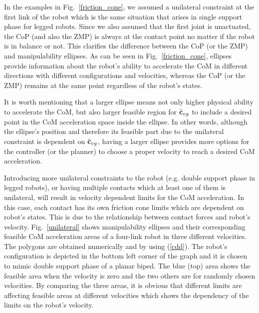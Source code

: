 In the examples in Fig.~\ref{friction_cone}, we assumed a unilateral
constraint at the first link of the robot which is the same situation that
arises in single support phase for legged robots.  Since we also assumed that
the first joint is unactuated, the CoP (and also the ZMP) is always at the
contact point no matter if the robot is in balance or not.  This clarifies the
difference between the CoP (or the ZMP) and manipulability ellipses.  As can
be seen in Fig.~\ref{friction_cone}, ellipses provide information about the
robot's ability to accelerate the CoM in different directions with different
configurations and velocities, whereas the CoP (or the ZMP) remains at the
same point regardless of the robot's states.

It is worth mentioning that a larger ellipse means not only higher physical
ability to accelerate the CoM, but also larger feasible region for
$\ddot{\mathbf{c}}_{vg}$ to include a desired point in the CoM acceleration space
inside the ellipse.  In other words, although the ellipse's position and
therefore its feasible part due to the unilateral constraint is dependent on
$\ddot{\mathbf{c}}_{vg}$, having a larger ellipse provides more options for the
controller (or the planner) to choose a proper velocity to reach a desired CoM
acceleration.

Introducing more unilateral constraints to the robot (e.g. double support
phase in legged robots), or having multiple contacts which at least one of
them is unilateral, will result in velocity dependent limits for the CoM
acceleration.  In this case, each contact has its own friction cone limits
which are dependent on robot's states.  This is due to the relationship
between contact forces and robot's velocity.  Fig.~\ref{unilateral} shows
manipulability ellipses and their corresponding feasible CoM acceleration
areas of a four-link robot in three different velocities.  The polygons are
obtained numerically and by using (\ref{cdd}).  The robot's configuration is
depicted in the bottom left corner of the graph and it is chosen to mimic
double support phase of a planar biped.  The blue (top) area shows the
feasible area when the velocity is zero and the two others are for randomly
chosen velocities.  By comparing the three areas, it is obvious that different
limits are affecting feasible areas at different velocities which shows the
dependency of the limits on the robot's velocity.

